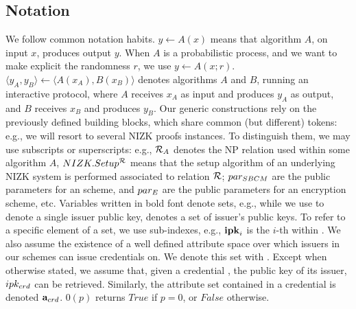 \subsection{Notation}
\label{ssec:notation}

We follow common notation habits. $y \gets A(x)$ means that algorithm $A$, on
input $x$, produces output $y$. When $A$ is a probabilistic process, and we want
to make explicit the randomness $r$, we use $y \gets A(x;r)$. $\langle y_A,y_B
\rangle \gets \langle A(x_A),B(x_B)\rangle$ denotes algorithms $A$ and $B$,
running an interactive protocol, where $A$ receives $x_A$ as input and produces
$y_A$ as output, and $B$ receives $x_B$ and produces $y_B$.
%
Our generic constructions rely on the previously defined building blocks, which
share common (but different)
tokens: e.g., we will resort to several NIZK proofs instances. To distinguish
them, we may use subscripts or superscripts: e.g., $\mathcal{R}_A$ denotes the
NP relation used within some algorithm $A$, $NIZK.Setup^{\mathcal{R}}$ means that
the setup algorithm of an underlying NIZK system is performed associated to
relation $\mathcal{R}$; $par_{SBCM}$ are the public parameters for an \SBCM scheme,
and $par_{E}$ are the public parameters for an encryption scheme, etc. Variables
written in bold font denote sets, e.g., while we use \ipk to denote a single
issuer public key, \sipk denotes a set of issuer's public keys. To refer to
a specific element of a set, we use sub-indexes, e.g., $\mathbf{ipk}_i$ is the $i$-th
\ipk within \sipk.
%
We also assume the existence of a well defined attribute space over which
issuers in our schemes can issue credentials on. We denote this set with
\AttrSpace.
%
Except when otherwise stated, we assume that, given a credential \cred, the
public key of its issuer, $ipk_{crd}$ can be retrieved. Similarly, the
attribute set contained in a credential \cred is denoted $\mathbf{a}_{crd}$.
%
$0(p)$ returns $True$ if $p=0$, or $False$ otherwise.

